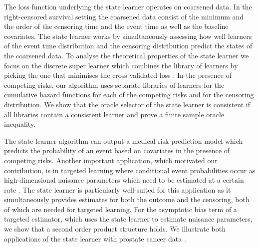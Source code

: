 \documentclass[11pt]{article}
\theoremstyle{thmstyleone}%
\theoremstyle{thmstyletwo}%
\theoremstyle{thmstylethree}%
\newcommand{\1}{\mathds{1}}
\begin{document}
The loss function underlying the state learner operates on coarsened data. In
the right-censored survival setting the coarsened data consist of the minimum
and the order of the censoring time and the event time as well as the baseline
covariates. The state learner works by simultaneously assessing how well
learners of the event time distribution and the censoring distribution predict
the states of the coarsened data. To analyse the theoretical properties of the
state learner we focus on the discrete super learner which combines the library
of learners by picking the one that minimises the cross-validated loss
\citep{van2007super}. In the presence of competing risks, our algorithm uses
separate libraries of learners for the cumulative hazard functions for each of
the competing risks and for the censoring distribution. We show that the oracle
selector of the state learner is consistent if all libraries contain a
consistent learner and prove a finite sample oracle inequality.

The state learner algorithm can output a medical risk prediction model
\citep{gerds2021medical} which predicts the probability of an event based on
covariates in the presence of competing risks. Another important application,
which motivated our contribution, is in targeted learning where conditional
event probabilities occur as high-dimensional nuisance parameters which need to
be estimated at a certain rate \citep{van2011targeted, rytgaard2021estimation,
  rytgaard2022targeted}. The state learner is particularly well-suited for this
application as it simultaneously provides estimates for both the outcome and the
censoring, both of which are needed for targeted learning. For the asymptotic
bias term of a targeted estimator, which uses the state learner to estimate
nuisance parameters, we show that a second order product structure holds. We
illustrate both applications of the state learner with prostate cancer data
\citep{kattan2000pretreatment}.
\end{document}
